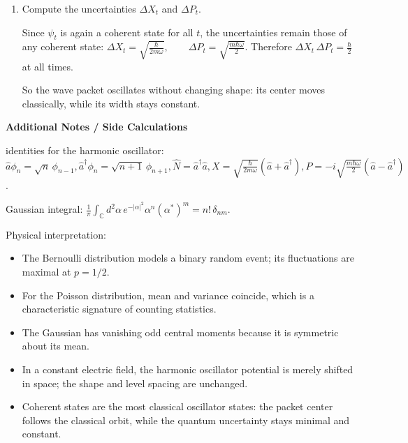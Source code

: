 \documentclass[11pt,a4paper]{scrartcl}
\begin{document}
\begin{enumerate}[label=(\alph*)]
\begin{calculationbox}
    The energy expectation value is
    $
    \langle H\rangle_t
    =
    \hbar\omega\left(|\alpha_t|^2+\frac12\right).
    $
    Since $|\alpha_t|=|\alpha_0|$, this is constant:
    $
    \langle H\rangle_t=\hbar\omega\left(|\alpha_0|^2+\frac12\right).
    $

    The classical harmonic oscillator energy is also conserved. So the expectation values of $X$ and $P$ follow the classical trajectory exactly, while the energy remains constant.
    \end{calculationbox}

    \item Compute the uncertainties $\Delta X_t$ and $\Delta P_t$.

    \begin{solutionbox}
    Since $\psi_t$ is again a coherent state for all $t$, the uncertainties remain those of any coherent state:
    $
    \Delta X_t=\sqrt{\frac{\hbar}{2m\omega}},
    \qquad
    \Delta P_t=\sqrt{\frac{m\hbar\omega}{2}}.
    $
    Therefore
    $
    \Delta X_t\,\Delta P_t=\frac{\hbar}{2}
    $
    at all times.

    So the wave packet oscillates without changing shape: its center moves classically, while its width stays constant.
    \end{solutionbox}
\end{enumerate}

\textbf{Additional Notes / Side Calculations}

\begin{sidecalcbox}
identities for the harmonic oscillator:
    $\hat a \phi_n = \sqrt{n}\,\phi_{n-1},
    \hat a^\dagger \phi_n = \sqrt{n+1}\,\phi_{n+1},
    \hat N = \hat a^\dagger \hat a,
    X = \sqrt{\frac{\hbar}{2m\omega}}(\hat a+\hat a^\dagger), 
    P = -i\sqrt{\frac{m\hbar\omega}{2}}(\hat a-\hat a^\dagger)$.

Gaussian integral:
$
\frac1\pi \int_{\mathbb{C}} d^2\alpha\,
e^{-|\alpha|^2}\alpha^n(\alpha^*)^m
= n!\,\delta_{nm}.
$
\end{sidecalcbox}

\begin{notebox}
Physical interpretation:
\begin{itemize}
    \item The Bernoulli distribution models a binary random event; its fluctuations are maximal at $p=1/2$.
    \item For the Poisson distribution, mean and variance coincide, which is a characteristic signature of counting statistics.
    \item The Gaussian has vanishing odd central moments because it is symmetric about its mean.
    \item In a constant electric field, the harmonic oscillator potential is merely shifted in space; the shape and level spacing are unchanged.
    \item Coherent states are the most classical oscillator states: the packet center follows the classical orbit, while the quantum uncertainty stays minimal and constant.
\end{itemize}
\end{notebox}
\end{document}
